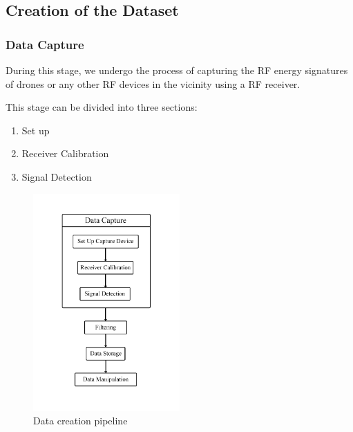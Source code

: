 \subsection{Creation of the Dataset}
\subsubsection*{ Data Capture}

\noindent During this stage, we undergo the process of capturing the RF energy signatures of drones or any other RF devices in the vicinity using a RF receiver.

\noindent This stage can be divided into three sections:
\begin{enumerate}
  \item Set up
  \item Receiver Calibration
  \item Signal Detection
\end{enumerate}
\begin{figure}[H]
  \centering
  \includegraphics[width=0.5\textwidth]{Data creation.png }
  \caption{Data creation pipeline}
\end{figure}

